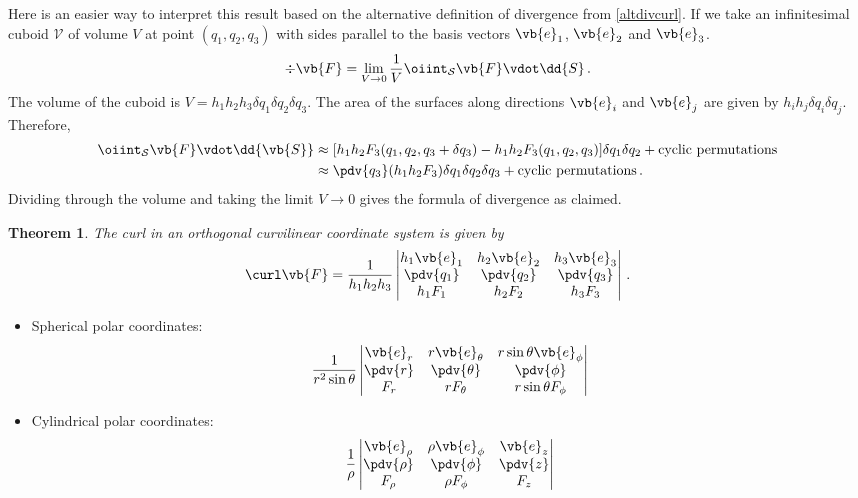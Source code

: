 \documentclass{article}
\theoremstyle{plain}\theoremheaderfont{\normalfont\itshape}\theorembodyfont{\rmfamily}\theoremseparator{.}\newtheorem*{rem}{Remark}\newtheorem*{ex}{Example}\newtheorem*{proof}{Proof}\newtheorem*{altp}{Alternative proof}
\theoremstyle{plain}\theoremheaderfont{\normalfont\bfseries}\theorembodyfont{\rmfamily}\theoremseparator{.}\newtheorem{thm}{Theorem}[section]\newtheorem{lem}[thm]{Lemma}\newtheorem{prop}[thm]{Proposition}\newtheorem*{cor}{Corollary}\newtheorem{defn}[thm]{Definition}\newtheorem{clm}[thm]{Claim}\newtheorem{clminproof}{Claim}
\theoremstyle{break}\theoremheaderfont{\normalfont\itshape}\theorembodyfont{\rmfamily}\theoremseparator{.\medskip}\newtheorem*{proofskip}{Proof}\newtheorem*{exs}{Examples}\newtheorem*{rems}{Remarks}
\theoremstyle{break}\theoremheaderfont{\normalfont\bfseries}\theorembodyfont{\rmfamily}\theoremseparator{.\medskip}\newtheorem{lemskip}[thm]{Lemma}\newtheorem{defnskip}[thm]{Definition}\newtheorem{propskip}[thm]{Proposition}\newtheorem{thmskip}[thm]{Theorem}
\numberwithin{equation}{section}
\begin{document}
	Here is an easier way to interpret this result based on the alternative definition of divergence from \cref{altdivcurl}. If we take an infinitesimal cuboid \(\mathcal{V}\) of volume \(V\) at point \((q_1,q_2,q_3)\) with sides parallel to the basis vectors \(\vb{e}_1\), \(\vb{e}_2\) and \(\vb{e}_3\).
	\[\div\vb{F}=\lim_{V\to 0}\frac{1}{V}\oiint_\mathcal{S}\vb{F}\vdot\dd{S}\,.\]
	The volume of the cuboid is \(V=h_1h_2h_3\delta q_1\delta q_2\delta q_3\). The area of the surfaces along directions \(\vb{e}_i\) and \(\vb{e}_j\) are given by \(h_ih_j\delta q_i\delta q_j\). Therefore,
	\begin{align*}
		\oiint_\mathcal{S}\vb{F}\vdot\dd{\vb{S}}&\approx[h_1h_2F_3(q_1,q_2,q_3+\delta q_3)-h_1h_2F_3(q_1,q_2,q_3)]\delta q_1\delta q_2+\text{cyclic permutations}\\
		&\approx\pdv{q_3}(h_1h_2F_3)\delta q_1\delta q_2\delta q_3 +\text{cyclic permutations}\,.
	\end{align*}
	Dividing through the volume and taking the limit \(V\to 0\) gives the formula of divergence as claimed.
	\begin{thm}
		The curl in an orthogonal curvilinear coordinate system is given by
		\[\curl\vb{F}=\frac{1}{h_1h_2h_3}\begin{vmatrix}
			h_1\vb{e}_1 & h_2\vb{e}_2 & h_3\vb{e}_3 \\
			\pdv{q_1} & \pdv{q_2} & \pdv{q_3} \\
			h_1F_1 & h_2F_2 & h_3F_3
		\end{vmatrix}\,.\]
	\end{thm}
	\begin{itemize}[leftmargin=50pt]
		\item Spherical polar coordinates:
		\[\frac{1}{r^2\sin\theta}\begin{vmatrix}
			\vb{e}_r & r\vb{e}_\theta & r\sin\theta\vb{e}_\phi \\
			\pdv{r} & \pdv{\theta} & \pdv{\phi} \\
			F_r & rF_\theta & r\sin\theta F_\phi
		\end{vmatrix}\]
		\item Cylindrical polar coordinates:
		\[\frac{1}{\rho}\begin{vmatrix}
			\vb{e}_\rho & \rho\vb{e}_\phi & \vb{e}_z \\
			\pdv{\rho} & \pdv{\phi} & \pdv{z} \\
			F_\rho & \rho F_\phi & F_z
		\end{vmatrix}\]
	\end{itemize}
\end{document}
